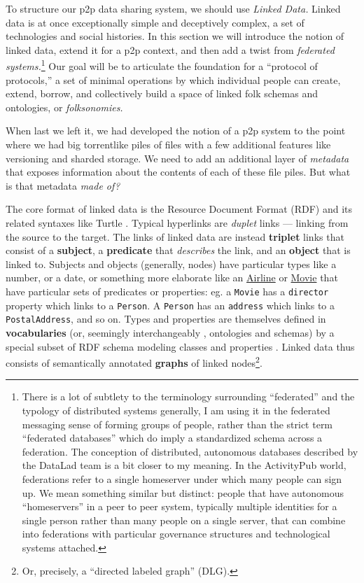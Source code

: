 To structure our p2p data sharing system, we should use \emph{Linked
Data.} Linked data is at once exceptionally simple and deceptively
complex, a set of technologies and social histories. In this section we
will introduce the notion of linked data, extend it for a p2p context,
and then add a twist from \emph{federated systems.}\footnote{There is a
  lot of subtlety to the terminology surrounding ``federated'' and the
  typology of distributed systems generally, I am using it in the
  federated messaging sense of forming groups of people, rather than the
  strict term ``federated databases'' which do imply a standardized
  schema across a federation. The conception of distributed, autonomous
  databases described by the DataLad team \citep{hankeDefenseDecentralizedResearch2021}  is a bit closer to my
  meaning. In the ActivityPub world, federations refer to a single
  homeserver under which many people can sign up. We mean something
  similar but distinct: people that have autonomous ``homeservers'' in a
  peer to peer system, typically multiple identities for a single person
  rather than many people on a single server, that can combine into
  federations with particular governance structures and technological
  systems attached.} Our goal will be to articulate the foundation for a
``protocol of protocols,'' a set of minimal operations by which
individual people can create, extend, borrow, and collectively build a
space of linked folk schemas and ontologies, or \emph{folksonomies.}

When last we left it, we had developed the notion of a p2p system to the
point where we had big torrentlike piles of files with a few additional
features like versioning and sharded storage. We need to add an
additional layer of \emph{metadata} that exposes information about the
contents of each of these file piles. But what is that metadata
\emph{made of?}

The core format of linked data is the Resource Document Format (RDF)
\citep{klyneRDFConceptsAbstract2014}  and its related syntaxes
like Turtle \citep{beckettRDFTurtle2014} . Typical hyperlinks are
\emph{duplet} links --- linking from the source to the target. The links
of linked data are instead \textbf{triplet} links that consist of a
\textbf{subject}, a \textbf{predicate} that \emph{describes} the link,
and an \textbf{object} that is linked to. Subjects and objects
(generally, nodes) have particular types like a number, or a date, or
something more elaborate like an
\href{https://schema.org/Airline}{Airline} or
\href{https://schema.org/Movie}{Movie} that have particular sets of
predicates or properties: eg. a \texttt{Movie} has a \texttt{director}
property which links to a \texttt{Person}. A \texttt{Person} has an
\texttt{address} which links to a \texttt{PostalAddress}, and so on.
Types and properties are themselves defined in \textbf{vocabularies}
(or, seemingly interchangeably \citep{w3cOntologiesW3C} ,
ontologies and schemas) by a special subset of RDF schema modeling
classes and properties \citep{brickleyRDFSchema2014} . Linked data
thus consists of semantically annotated \textbf{graphs} of linked
nodes\footnote{Or, precisely, a ``directed labeled graph'' (DLG).}.

